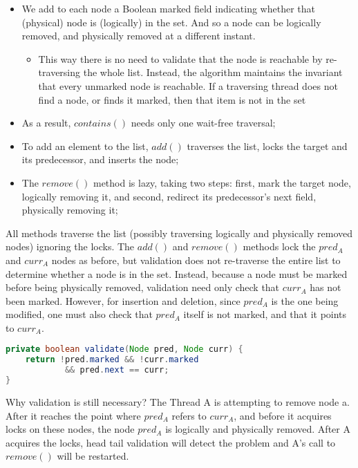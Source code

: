 \begin{itemize}
\begin{itemize}
        \item We add to each node a Boolean marked field indicating whether that (physical) node is (logically) in the set. And so a node can be logically removed, and physically removed at a different instant.
        \begin{itemize}
            \item This way there is no need to validate that the node is reachable by re-traversing the whole list. Instead, the algorithm maintains the invariant that every unmarked node is reachable. If a traversing thread does not find a node, or finds it marked, then that item is not in the set
        \end{itemize}
        \item As a result, $contains()$ needs only one wait-free traversal;
        \item To add an element to the list, $add()$ traverses the list, locks the target and its predecessor, and inserts the node;
        \item The $remove()$ method is lazy, taking two steps: first, mark the target node, logically removing it, and second, redirect its predecessor’s next field, physically removing it;
    \end{itemize}
    \par All methods traverse the list (possibly traversing logically and physically removed nodes) ignoring the locks. The $add()$ and $remove()$ methods lock the $pred_A$ and $curr_A$ nodes as before, but validation does not re-traverse the entire list to determine whether a node is in the set. Instead, because a node must be marked before being physically removed, validation need only check that $curr_A $ has not been marked. However, for insertion and deletion, since $pred_A$ is the one being modified, one must also check that $pred_A$ itself is not marked, and that it points to $curr_A$.
    \begin{tcolorbox}[colback=nightblue!5!white, colframe=nightblue!75!black, title= Validate Method]
        \begin{lstlisting}[label={lst:lazycode1}, language=Java, morekeywords={}]
private boolean validate(Node pred, Node curr) {
    return !pred.marked && !curr.marked
            && pred.next == curr;
}\end{lstlisting}
    \end{tcolorbox}
    \par Why validation is still necessary? The Thread A is attempting to remove node a. After it reaches the point where $pred_A$ refers to $curr_A$, and before it
    acquires locks on these nodes, the node $pred_A$ is logically and physically removed. After A acquires the locks, head tail validation will detect the problem and A’s call to $remove()$ will be restarted.
\end{itemize}
